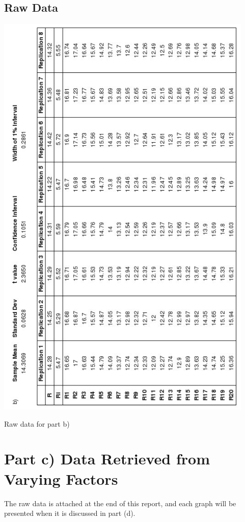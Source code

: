 \documentclass[12pt]{article}
\begin{document}
\newpage
\begin{table}[htp!]
\subsection{Raw Data}
\begin{center}
\includegraphics[height=20cm]{part_b.jpg}
\caption{Raw data for part b)}
\end{center}
\end{table}
\newpage

\section{Part c) Data Retrieved from Varying Factors}
The raw data is attached at the end of this report, and each graph will be
presented when it is discussed in part (d).
\end{document}
